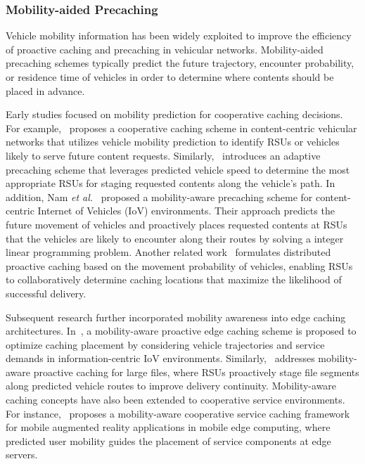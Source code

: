 \subsubsection{Mobility-aided Precaching}
\label{subsubsec:rw_mobility_precaching}

Vehicle mobility information has been widely exploited to improve the efficiency of proactive caching and precaching in vehicular networks. 
Mobility-aided precaching schemes typically predict the future trajectory, encounter probability, or residence time of vehicles in order to determine where contents should be placed in advance.

Early studies focused on mobility prediction for cooperative caching decisions. 
For example,~\cite{VehiclesMobility} proposes a cooperative caching scheme in content-centric vehicular networks that utilizes vehicle mobility prediction to identify RSUs or vehicles likely to serve future content requests. 
Similarly,~\cite{AdaptiveContentPrecaching} introduces an adaptive precaching scheme that leverages predicted vehicle speed to determine the most appropriate RSUs for staging requested contents along the vehicle’s path.
In addition, Nam \emph{et al.}~\cite{Nam} proposed a mobility-aware precaching scheme for content-centric Internet of Vehicles (IoV) environments. 
Their approach predicts the future movement of vehicles and proactively places requested contents at RSUs that the vehicles are likely to encounter along their routes by solving a integer linear programming problem. 
Another related work~\cite{OptimizedDistributedProactiveCaching} formulates distributed proactive caching based on the movement probability of vehicles, enabling RSUs to collaboratively determine caching locations that maximize the likelihood of successful delivery.

Subsequent research further incorporated mobility awareness into edge caching architectures. 
In~\cite{MobilityAwareEdgeCaching}, a mobility-aware proactive edge caching scheme is proposed to optimize caching placement by considering vehicle trajectories and service demands in information-centric IoV environments. 
Similarly,~\cite{LargeFileMobilityCaching} addresses mobility-aware proactive caching for large files, where RSUs proactively stage file segments along predicted vehicle routes to improve delivery continuity. 
Mobility-aware caching concepts have also been extended to cooperative service environments. 
For instance,~\cite{MobilityAwareServiceCaching} proposes a mobility-aware cooperative service caching framework for mobile augmented reality applications in mobile edge computing, where predicted user mobility guides the placement of service components at edge servers.






